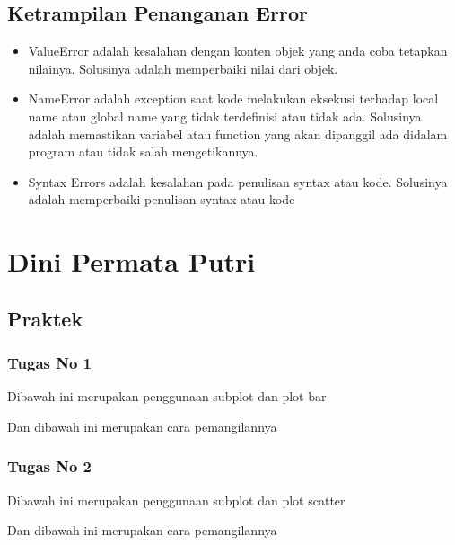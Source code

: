 \subsection{Ketrampilan Penanganan Error}
\begin{itemize}
\item ValueError adalah kesalahan dengan konten objek yang anda coba tetapkan nilainya. Solusinya adalah memperbaiki nilai dari objek.

\item NameError adalah exception saat kode melakukan eksekusi terhadap local name atau global name yang tidak terdefinisi atau tidak ada. Solusinya adalah memastikan variabel atau function yang akan dipanggil ada didalam program atau tidak salah mengetikannya.

\item Syntax Errors adalah kesalahan pada penulisan syntax atau kode. Solusinya adalah memperbaiki penulisan syntax atau kode



\end{itemize}
\section{Dini Permata Putri}
\subsection{Praktek}
\subsubsection{Tugas No 1}
\hfill \break
Dibawah ini merupakan penggunaan subplot dan plot bar

Dan dibawah ini merupakan cara pemangilannya



\subsubsection{Tugas No 2}

\hfill \break

Dibawah ini merupakan penggunaan subplot dan plot scatter

Dan dibawah ini merupakan cara pemangilannya



